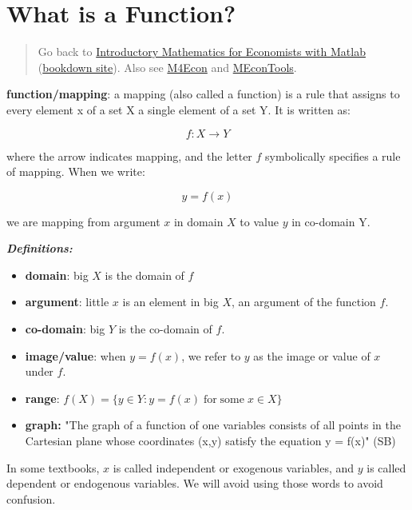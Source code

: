 \documentclass[
]{book}
\begin{document}
\vspace{1em}

\hypertarget{what-is-a-function}{%
\section{What is a Function?}\label{what-is-a-function}}

\begin{quote}
Go back to \href{https://math4econ.github.io/}{Introductory Mathematics for Economists with Matlab} (\href{https://math4econ.github.io/bookdown}{bookdown site}). Also see \href{http://fanwangecon.github.io/M4Econ}{M4Econ} and \href{https://fanwangecon.github.io/MEconTools/}{MEconTools}.
\end{quote}

\textbf{function/mapping}: a mapping (also called a function) is a rule that
assigns to every element x of a set X a single element of a set Y. It is
written as:

\[f:X\to Y\]

where the arrow indicates mapping, and the letter \(f\) symbolically
specifies a rule of mapping. When we write:

\[y=f(x)\]

we are mapping from argument \(x\) in domain \(X\) to value \(y\) in co-domain
Y.

\textbf{\emph{Definitions:}}

\begin{itemize}
\item
  \textbf{domain}: big \(X\) is the domain of \(f\)
\item
  \textbf{argument}: little \(x\) is an element in big \(X\), an argument of
  the function \(f\).
\item
  \textbf{co-domain}: big \(Y\) is the co-domain of \(f\).
\item
  \textbf{image/value}: when \(y=f(x)\), we refer to \(y\) as the image or
  value of \(x\) under \(f\).
\item
  \textbf{range}:
  \(f(X)=\lbrace y\in Y:y=f(x)\;\textrm{for}\;\textrm{some}\;x\in X\rbrace\)
\item
  \textbf{graph:} "The graph of a function of one variables consists of
  all points in the Cartesian plane whose coordinates (x,y) satisfy
  the equation y = f(x)" (SB)
\end{itemize}

In some textbooks, \(x\) is called independent or exogenous variables, and
\(y\) is called dependent or endogenous variables. We will avoid using
those words to avoid confusion.
\end{document}
